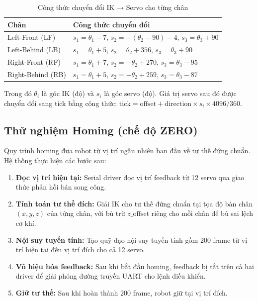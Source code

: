 \begin{table}[H]
\centering
\caption{Công thức chuyển đổi IK → Servo cho từng chân}
\label{tab:ik_to_servo}
\renewcommand{\arraystretch}{1.5}
\begin{tabular}{|l|l|}
\hline
\textbf{Chân} & \textbf{Công thức chuyển đổi} \\ \hline
Left-Front (LF) & $s_1 = \theta_1 - 7$, \quad $s_2 = -(\theta_2 - 90) - 4$, \quad $s_3 = \theta_3 + 90$ \\ \hline
Left-Behind (LB) & $s_1 = \theta_1 + 5$, \quad $s_2 = \theta_2 + 356$, \quad $s_3 = \theta_3 + 90$ \\ \hline
Right-Front (RF) & $s_1 = \theta_1 + 7$, \quad $s_2 = -\theta_2 + 270$, \quad $s_3 = \theta_3 - 95$ \\ \hline
Right-Behind (RB) & $s_1 = \theta_1 + 5$, \quad $s_2 = -\theta_2 + 259$, \quad $s_3 = \theta_3 - 87$ \\ \hline
\end{tabular}
\end{table}

Trong đó $\theta_i$ là góc IK (độ) và $s_i$ là góc servo (độ). Giá trị servo sau đó được chuyển đổi sang tick bằng công thức: $\text{tick} = \text{offset} + \text{direction} \times s_i \times 4096 / 360$.

\subsection{Thử nghiệm Homing (chế độ ZERO)}

Quy trình homing đưa robot từ vị trí ngẫu nhiên ban đầu về tư thế đứng chuẩn. Hệ thống thực hiện các bước sau:

\begin{enumerate}
    \item \textbf{Đọc vị trí hiện tại:} Serial driver đọc vị trí feedback từ 12 servo qua giao thức phản hồi bán song công.
    \item \textbf{Tính toán tư thế đích:} Giải IK cho tư thế đứng chuẩn tại tọa độ bàn chân $(x, y, z)$ của từng chân, với bù trừ $z\_\text{offset}$ riêng cho mỗi chân để bù sai lệch cơ khí.
    \item \textbf{Nội suy tuyến tính:} Tạo quỹ đạo nội suy tuyến tính gồm 200 frame từ vị trí hiện tại đến vị trí đích cho cả 12 servo.
    \item \textbf{Vô hiệu hóa feedback:} Sau khi bắt đầu homing, feedback bị tắt trên cả hai driver để giải phóng đường truyền UART cho lệnh điều khiển.
    \item \textbf{Giữ tư thế:} Sau khi hoàn thành 200 frame, robot giữ tại vị trí đích.
\end{enumerate}

